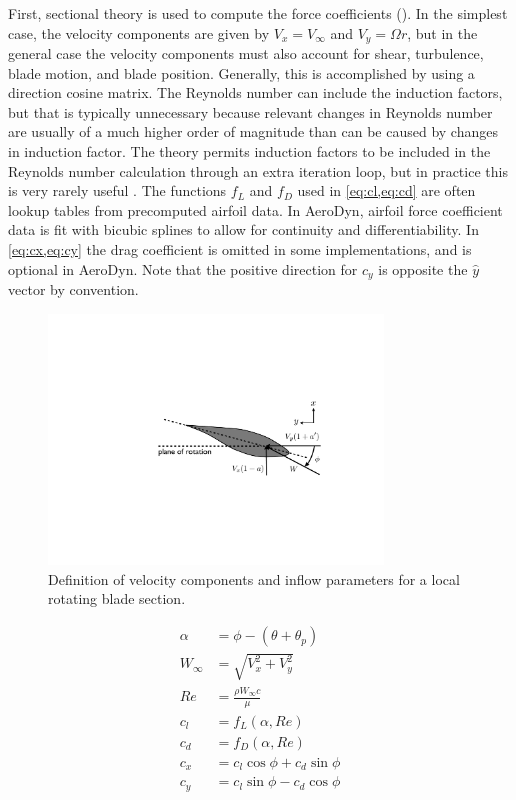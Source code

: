 \documentclass[]{aiaa-tc}%
\begin{document}
First, sectional theory is used to compute the force coefficients (). In the simplest case, the velocity components are given by $V_x = V_\infty$ and $V_y = \Omega r$, but in the general case the velocity components must also account for shear, turbulence, blade motion, and blade position.  Generally, this is accomplished by using a direction cosine matrix. The Reynolds number can include the induction factors, but that is typically unnecessary because relevant changes in Reynolds number are usually of a much higher order of magnitude than can be caused by changes in induction factor.  The theory permits induction factors to be included in the Reynolds number calculation through an extra iteration loop, but in practice this is very rarely useful \cite{Ning2013a}.  The functions $f_L$ and $f_D$ used in \cref{eq:cl,eq:cd} are often lookup tables from precomputed airfoil data.  In AeroDyn, airfoil force coefficient data is fit with bicubic splines to allow for continuity and differentiability.  In \cref{eq:cx,eq:cy} the drag coefficient is omitted in some implementations, and is optional in AeroDyn.  Note that the positive direction for $c_y$ is opposite the $\hat{y}$ vector by convention.

\begin{figure}[htbp]
\begin{center}
\includegraphics[width=3.5in]{images/inflow}
\caption{Definition of velocity components and inflow parameters for a local rotating blade section.}
\label{fig:inflow}
\end{center}
\end{figure}

\begin{align}
    \alpha &= \phi - (\theta + \theta_p) \label{eq:alpha}\\
    W_\infty &= \sqrt{V_x^2 + V_y^2} \label{eq:W}\\
    Re &= \frac{\rho W_\infty c}{\mu}\label{eq:Re}\\
    c_l &= f_L(\alpha, Re)\label{eq:cl}\\
    c_d &= f_D(\alpha, Re)\label{eq:cd}\\
    c_x &= c_l \cos\phi + c_d \sin\phi \label{eq:cx}\\
    c_y &= c_l \sin\phi - c_d \cos\phi \label{eq:cy}
\end{align}
\end{document}
